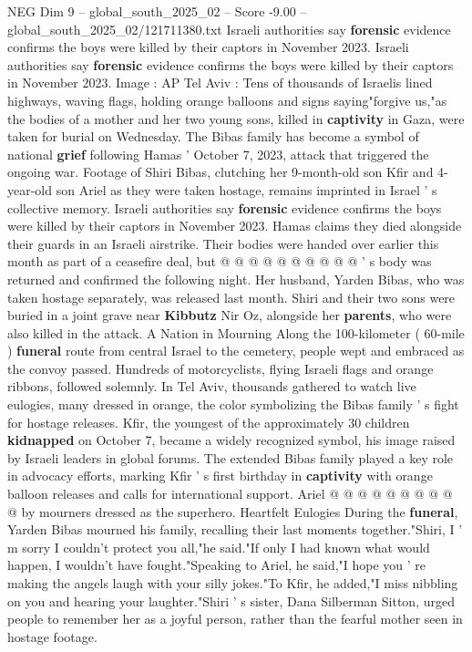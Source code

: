 \begin{textsample}{NEG Dim 9 – global\_south\_2025\_02 – Score -9.00 – global\_south\_2025\_02/121711380.txt}  \label{ex:f9_neg_182}
Israeli authorities say \textbf{forensic} evidence confirms the boys were killed by their captors in November 2023.
Israeli authorities say \textbf{forensic} evidence confirms the boys were killed by their captors in November 2023.
Image : AP Tel Aviv : Tens of thousands of Israelis lined highways, waving flags, holding orange balloons and signs saying"forgive us,"as the bodies of a mother and her two young sons, killed in \textbf{captivity} in Gaza, were taken for burial on Wednesday.
The Bibas family has become a symbol of national \textbf{grief} following Hamas ' October 7, 2023, attack that triggered the ongoing war.
Footage of Shiri Bibas, clutching her 9-month-old son Kfir and 4-year-old son Ariel as they were taken hostage, remains imprinted in Israel ' s collective memory.
Israeli authorities say \textbf{forensic} evidence confirms the boys were killed by their captors in November 2023.
Hamas claims they died alongside their guards in an Israeli airstrike.
Their bodies were handed over earlier this month as part of a ceasefire deal, but @ @ @ @ @ @ @ @ @ @ ' s body was returned and confirmed the following night.
Her husband, Yarden Bibas, who was taken hostage separately, was released last month.
Shiri and their two sons were buried in a joint grave near \textbf{Kibbutz} Nir Oz, alongside her \textbf{parents}, who were also killed in the attack.
A Nation in Mourning Along the 100-kilometer ( 60-mile ) \textbf{funeral} route from central Israel to the cemetery, people wept and embraced as the convoy passed.
Hundreds of motorcyclists, flying Israeli flags and orange ribbons, followed solemnly.
In Tel Aviv, thousands gathered to watch live eulogies, many dressed in orange, the color symbolizing the Bibas family ' s fight for hostage releases.
Kfir, the youngest of the approximately 30 children \textbf{kidnapped} on October 7, became a widely recognized symbol, his image raised by Israeli leaders in global forums.
The extended Bibas family played a key role in advocacy efforts, marking Kfir ' s first birthday in \textbf{captivity} with orange balloon releases and calls for international support.
Ariel @ @ @ @ @ @ @ @ @ @ by mourners dressed as the superhero.
Heartfelt Eulogies During the \textbf{funeral}, Yarden Bibas mourned his family, recalling their last moments together."Shiri, I ' m sorry I couldn't protect you all,"he said."If only I had known what would happen, I wouldn't have fought."Speaking to Ariel, he said,"I hope you ' re making the angels laugh with your silly jokes."To Kfir, he added,"I miss nibbling on you and hearing your laughter."Shiri ' s sister, Dana Silberman Sitton, urged people to remember her as a joyful person, rather than the fearful mother seen in hostage footage.

\end{textsample}
